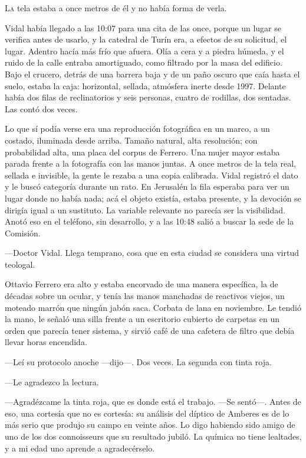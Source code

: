 \lettrine[lines=2, lhang=0.1, nindent=0.2em]{L}{a} tela estaba a once metros de él y no había forma de verla.


Vidal había llegado a las 10:07 para una cita de las once, porque un lugar se verifica antes de usarlo, y la catedral de Turín era, a efectos de su solicitud, el lugar. Adentro hacía más frío que afuera. Olía a cera y a piedra húmeda, y el ruido de la calle entraba amortiguado, como filtrado por la masa del edificio. Bajo el crucero, detrás de una barrera baja y de un paño oscuro que caía hasta el suelo, estaba la caja: horizontal, sellada, atmósfera inerte desde 1997. Delante había dos filas de reclinatorios y seis personas, cuatro de rodillas, dos sentadas. Las contó dos veces.

Lo que sí podía verse era una reproducción fotográfica en un marco, a un costado, iluminada desde arriba. Tamaño natural, alta resolución; con probabilidad alta, una placa del corpus de Ferrero. Una mujer mayor estaba parada frente a la fotografía con las manos juntas. A once metros de la tela real, sellada e invisible, la gente le rezaba a una copia calibrada. Vidal registró el dato y le buscó categoría durante un rato. En Jerusalén la fila esperaba para ver un lugar donde no había nada; acá el objeto existía, estaba presente, y la devoción se dirigía igual a un sustituto. La variable relevante no parecía ser la visibilidad. Anotó eso en el teléfono, sin desarrollo, y a las 10:48 salió a buscar la sede de la Comisión.


\scenebreak


---Doctor Vidal. Llega temprano, cosa que en esta ciudad se considera una virtud teologal.

Ottavio Ferrero era alto y estaba encorvado de una manera específica, la de décadas sobre un ocular, y tenía las manos manchadas de reactivos viejos, un moteado marrón que ningún jabón saca. Corbata de lana en noviembre. Le tendió la mano, le señaló una silla frente a un escritorio cubierto de carpetas en un orden que parecía tener sistema, y sirvió café de una cafetera de filtro que debía llevar horas encendida.

---Leí su protocolo anoche ---dijo---. Dos veces. La segunda con tinta roja.

---Le agradezco la lectura.

---Agradézcame la tinta roja, que es donde está el trabajo. ---Se sentó---. Antes de eso, una cortesía que no es cortesía: su análisis del díptico de Amberes es de lo más serio que produjo su campo en veinte años. Lo digo habiendo sido amigo de uno de los dos connoisseurs que su resultado jubiló. La química no tiene lealtades, y a mi edad uno aprende a agradecérselo.

